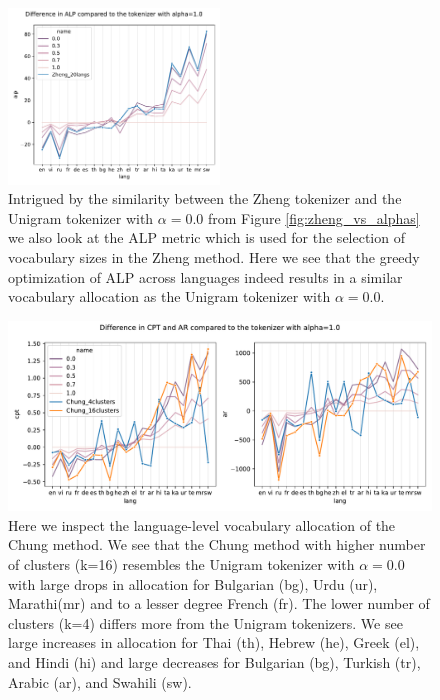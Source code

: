\begin{figure}
    \centering
    \includegraphics[width=0.5\textwidth]{figures/zheng_vs_alphas_alp.pdf}
    \caption{Intrigued by the similarity between the Zheng tokenizer and the Unigram tokenizer with $\alpha=0.0$ from Figure \ref{fig:zheng_vs_alphas} we also look at the ALP metric which is used for the selection of vocabulary sizes in the Zheng method. Here we see that the greedy optimization of ALP across languages indeed results in a similar vocabulary allocation as the Unigram tokenizer with $\alpha=0.0$.}
    \label{fig:zheng_vs_alphas_alp}
\end{figure}

\begin{figure}
    \centering
    \includegraphics[width=\textwidth]{figures/chung_vs_alphas.pdf}
    \caption{Here we inspect the language-level vocabulary allocation of the Chung method. We see that the Chung method with higher number of clusters (k=16) resembles the Unigram tokenizer with $\alpha=0.0$ with large drops in allocation for Bulgarian (bg), Urdu (ur), Marathi(mr) and to a lesser degree French (fr). The lower number of clusters (k=4) differs more from the Unigram tokenizers. We see large increases in allocation for Thai (th), Hebrew (he), Greek (el), and Hindi (hi) and large decreases for Bulgarian (bg), Turkish (tr), Arabic (ar), and Swahili (sw).}
    \label{fig:chung_vs_alphas}
\end{figure}

